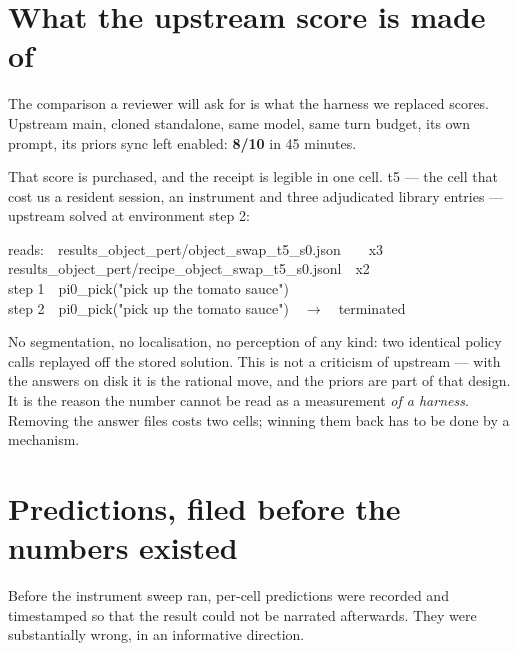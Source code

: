 \documentclass[11pt,a4paper]{article}
\begin{document}
\section{What the upstream score is made of}

The comparison a reviewer will ask for is what the harness we replaced scores.
Upstream main, cloned standalone, same model, same turn budget, its own prompt,
its priors sync left enabled: \textbf{8/10} in 45 minutes.

That score is purchased, and the receipt is legible in one cell. t5 --- the cell
that cost us a resident session, an instrument and three adjudicated library
entries --- upstream solved at environment step 2:

\begin{evidence}[title={Upstream t5, the entire run}]
\ttfamily\footnotesize
reads:\ \ results\_object\_pert/object\_swap\_t5\_s0.json\ \ \ \ x3\\
\hspace*{3.4em}results\_object\_pert/recipe\_object\_swap\_t5\_s0.jsonl\ \ x2\\[0.4em]
step 1\ \ pi0\_pick("pick up the tomato sauce")\\
step 2\ \ pi0\_pick("pick up the tomato sauce")\ \ $\rightarrow$\ \ terminated
\end{evidence}

\noindent
No segmentation, no localisation, no perception of any kind: two identical
policy calls replayed off the stored solution. This is not a criticism of
upstream --- with the answers on disk it is the rational move, and the priors
are part of that design. It is the reason the number cannot be read as a
measurement \emph{of a harness}. Removing the answer files costs two cells;
winning them back has to be done by a mechanism.

\section{Predictions, filed before the numbers existed}

Before the instrument sweep ran, per-cell predictions were recorded and
timestamped so that the result could not be narrated afterwards. They were
substantially wrong, in an informative direction.
\end{document}
